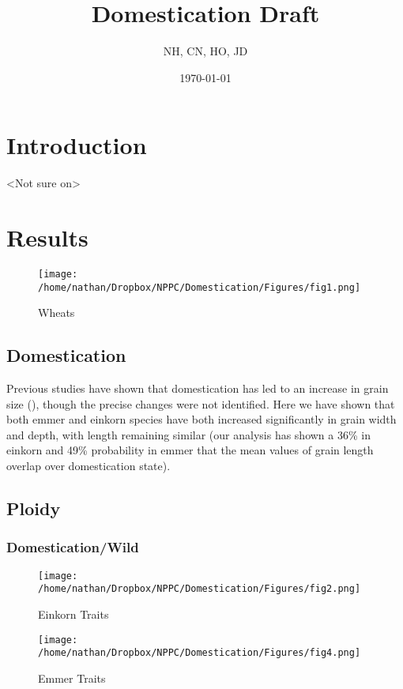 \documentclass[a4paper]{article}
\author{NH, CN, HO, JD}
\date{\today}
\title{Domestication Draft}
\begin{document}
\maketitle


\section{Introduction}
\label{sec:org700d30b}
<Not sure on>




\clearpage
\section{Results}
\label{sec:org3d5bf2d}

\begin{figure}[htbp]
\centering
\texttt{[image: /home/nathan/Dropbox/NPPC/Domestication/Figures/fig1.png]}
\caption{\label{fig:org4a7a3b6}
Wheats}
\end{figure}

\subsection{Domestication}
\label{sec:org6165991}
Previous studies have shown that domestication has led to an increase in grain size (\cite{Gegas2010,Peng2011}), though the precise changes were not identified.
Here we have shown that both emmer and einkorn species have both increased significantly in grain width and depth, with length remaining similar
(our analysis has shown a 36\% in einkorn and 49\% probability in emmer that the mean values of grain length overlap over domestication state).

\subsection{Ploidy}
\label{sec:orgd2c20ca}

\subsubsection{Domestication/Wild}
\label{sec:orgcc75f0c}

\begin{figure}[htbp]
\centering
\texttt{[image: /home/nathan/Dropbox/NPPC/Domestication/Figures/fig2.png]}
\caption{\label{fig:org683801b}
Einkorn Traits}
\end{figure}

\begin{figure}[htbp]
\centering
\texttt{[image: /home/nathan/Dropbox/NPPC/Domestication/Figures/fig4.png]}
\caption{\label{fig:orge2c4b6a}
Emmer Traits}
\end{figure}
\end{document}
